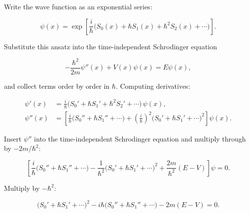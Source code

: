 Write the wave function as an exponential series:
\begin{linenomath}
\begin{equation*}
\psi(x) = \exp\left[\frac{i}{\hbar}\bigl(S_0(x) + \hbar S_1(x) + \hbar^2 S_2(x) + \cdots\bigr)\right].
\end{equation*}
\end{linenomath}
Substitute this ansatz into the time-independent Schrodinger equation
\begin{linenomath}
\begin{equation*}
-\frac{\hbar^2}{2m}\psi''(x) + V(x)\psi(x) = E\psi(x),
\end{equation*}
\end{linenomath}
and collect terms order by order in $\hbar$. Computing derivatives:
\begin{linenomath}
\begin{equation}
\begin{aligned}
\psi'(x) &= \frac{i}{\hbar}\bigl(S_0' + \hbar S_1' + \hbar^2 S_2' + \cdots\bigr)\,\psi(x),\\[4pt]
\psi''(x) &= \left[\frac{i}{\hbar}\bigl(S_0'' + \hbar S_1'' + \cdots\bigr) + \left(\frac{i}{\hbar}\right)^2\bigl(S_0' + \hbar S_1' + \cdots\bigr)^2\right]\psi(x).
\end{aligned}
\end{equation}
\end{linenomath}
Insert $\psi''$ into the time-independent Schrodinger equation and multiply through by $-2m/\hbar^2$:
\begin{linenomath}
\begin{equation}
\left[\frac{i}{\hbar}\bigl(S_0'' + \hbar S_1'' + \cdots\bigr) - \frac{1}{\hbar^2}\bigl(S_0' + \hbar S_1' + \cdots\bigr)^2 + \frac{2m}{\hbar^2}(E - V)\right]\psi = 0.
\end{equation}
\end{linenomath}
Multiply by $-\hbar^2$:
\begin{linenomath}
\begin{equation}
\bigl(S_0' + \hbar S_1' + \cdots\bigr)^2 - i\hbar\bigl(S_0'' + \hbar S_1'' + \cdots\bigr) - 2m(E-V) = 0.
\end{equation}
\end{linenomath}

